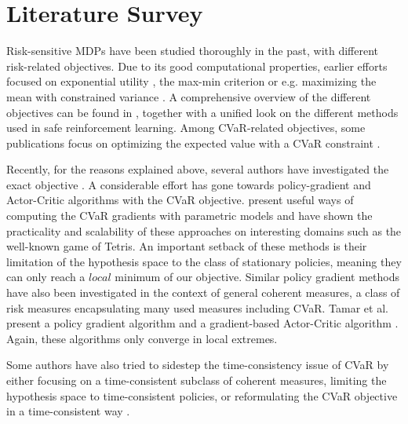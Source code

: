 


\section{Literature Survey}\label{sec:prelim:literature}

Risk-sensitive MDPs have been studied thoroughly in the past, with different risk-related objectives. Due to its good computational properties, earlier efforts focused on exponential utility \citep{howard1972risk}, the max-min criterion \citep{coraluppi1998optimal} or e.g. maximizing the mean with constrained variance \citep{sobel1982variance}. A comprehensive overview of the different objectives can be found in \citet{garcia2015comprehensive}, together with a unified look on the different methods used in safe reinforcement learning. Among CVaR-related objectives, some publications focus on optimizing the expected value with a CVaR constraint \citep{borkar2010risk, prashanth2014policy}.

Recently, for the reasons explained above, several authors have investigated the exact objective . A considerable effort has gone towards policy-gradient \citep{sutton2000policy} and Actor-Critic \citep{konda2000actor} algorithms with the CVaR objective. \citet{tamar2015optimizing, chow2014algorithms} present useful ways of computing the CVaR gradients with parametric models and have shown the practicality and scalability of these approaches on interesting domains such as the well-known game of Tetris. An important setback of these methods is their limitation of the hypothesis space to the class of stationary policies, meaning they can only reach a $local$ minimum of our objective.
Similar policy gradient methods have also been investigated in the context of general coherent measures, a class of risk measures encapsulating many used measures including CVaR. Tamar et al. present a policy gradient algorithm and a gradient-based Actor-Critic algorithm \citep{tamar2017sequential}. Again, these algorithms only converge in local extremes.

Some authors have also tried to sidestep the time-consistency issue of CVaR by either focusing on a time-consistent subclass of coherent measures, limiting the hypothesis space to time-consistent policies, or reformulating the CVaR objective in a time-consistent way \cite{miller2017optimal}.

